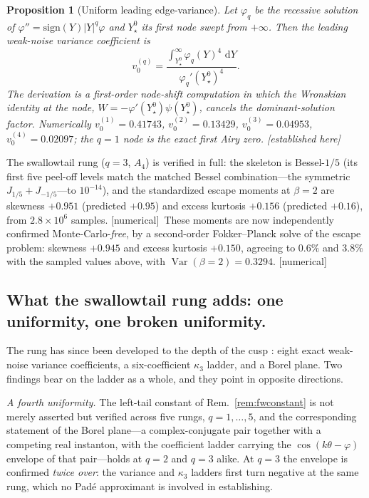 \documentclass[11pt,reqno]{amsart}
\theoremstyle{plain}
\newtheorem{proposition}[theorem]{Proposition}
\theoremstyle{definition}
\theoremstyle{remark}
\newcommand{\dd}{\,\mathrm{d}}
\newcommand{\Var}{\operatorname{Var}}
\newcommand{\tagPr}{{\footnotesize\textsf{[established here]}}}
\newcommand{\tagN}{{\footnotesize\textsf{[numerical]}}}
\begin{document}
\begin{proposition}[Uniform leading edge-variance]\label{prop:v0q}
Let $\varphi_q$ be the recessive solution of $\varphi''=\mathrm{sign}(Y)|Y|^q\varphi$ and $Y_\star^0$
its first node swept from $+\infty$. Then the leading weak-noise variance coefficient is
\[
v_0^{(q)}=\frac{\int_{Y_\star^0}^\infty \varphi_q(Y)^4\,\dd Y}{\varphi_q'(Y_\star^0)^4}.
\]
The derivation is a first-order node-shift computation in which the Wronskian identity at the node,
$W=-\varphi'(Y_\star^0)\psi(Y_\star^0)$, cancels the dominant-solution factor. Numerically
$v_0^{(1)}=0.41743$, $v_0^{(2)}=0.13429$, $v_0^{(3)}=0.04953$, $v_0^{(4)}=0.02097$; the $q{=}1$
node is the exact first Airy zero. \tagPr
\end{proposition}

The swallowtail rung ($q{=}3$, $A_4$) is verified in full: the skeleton is Bessel-$1/5$ (its first
five peel-off levels match the matched Bessel combination---the symmetric $J_{1/5}+J_{-1/5}$---to
$10^{-14}$), and the standardized escape moments at $\beta{=}2$ are skewness $+0.951$ (predicted
$+0.95$) and excess kurtosis $+0.156$ (predicted $+0.16$), from $2.8\times10^6$ samples. \tagN\
These moments are now independently confirmed Monte-Carlo-\emph{free}, by a second-order
Fokker--Planck solve of the escape problem: skewness $+0.945$ and excess kurtosis $+0.150$, agreeing
to $0.6\%$ and $3.8\%$ with the sampled values above, with $\Var(\beta{=}2)=0.3294$. \tagN

\subsection*{What the swallowtail rung adds: one uniformity, one broken uniformity.}
The rung has since been developed to the depth of the cusp \cite{SwallowtailPaper}: eight exact
weak-noise variance coefficients, a six-coefficient $\kappa_3$ ladder, and a Borel plane. Two
findings bear on the ladder as a whole, and they point in opposite directions.

\emph{A fourth uniformity.} The left-tail constant of Rem.~\ref{rem:fwconstant} is not merely
asserted but verified across five rungs, $q=1,\dots,5$, and the corresponding statement of the
Borel plane---a complex-conjugate pair together with a competing real instanton, with the
coefficient ladder carrying the $\cos(k\theta-\varphi)$ envelope of that pair---holds at $q=2$ and
$q=3$ alike. At $q=3$ the envelope is confirmed \emph{twice over}: the variance and $\kappa_3$
ladders first turn negative at the same rung, which no Pad\'e approximant is involved in
establishing.
\end{document}
